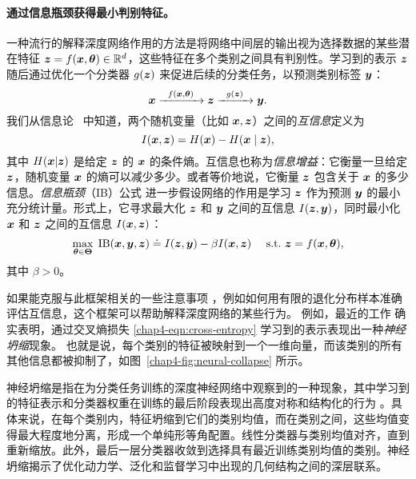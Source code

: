 \documentclass[../../book-main.tex]{subfiles}
\begin{document}
\paragraph{通过信息瓶颈获得最小判别特征。}
一种流行的解释深度网络作用的方法是将网络中间层的输出视为选择数据的某些潜在特征 $\bm{z} = f(\bm{x}, \bm \theta) \in \mathbb{R}^d$，这些特征在多个类别之间具有判别性。学习到的表示 $\bm{z}$ 随后通过优化一个分类器 $g(\bm{z})$ 来促进后续的分类任务，以预测类别标签 $\bm{y}$：
\begin{equation}
	\bm{x}   \xrightarrow{\hspace{2mm} f(\bm{x}, \bm \theta)\hspace{2mm}} \bm{z}  \xrightarrow{\hspace{2mm} g(\bm{z}) \hspace{2mm}} \bm{y}.
\end{equation}
我们从信息论~\cite{Cover-Thomas} 中知道，两个随机变量（比如 $\bm{x},\bm{z}$）之间的{\em 互信息}定义为
\begin{equation}
	I(\bm{x}, \bm{z}) = H(\bm{x}) - H(\bm{x}\mid \bm{z}),
\end{equation}
其中 $H(\bm{x} \vert \bm{z})$ 是给定 $\bm{z}$ 的 $\bm{x}$ 的条件熵。互信息也称为{\em 信息增益}：它衡量一旦给定 $\bm{z}$，随机变量 $\bm{x}$ 的熵可以减少多少。或者等价地说，它衡量 $\bm{z}$ 包含关于 $\bm{x}$ 的多少信息。{\em 信息瓶颈}（IB）公式 \cite{Tishby-ITW2015} 进一步假设网络的作用是学习 $\bm{z}$ 作为预测 $\bm{y}$ 的最小充分统计量。形式上，它寻求最大化 $\bm{z}$ 和 $\bm{y}$ 之间的互信息 $I(\bm{z}, \bm{y})$，同时最小化 $\bm{x}$ 和 $\bm{z}$ 之间的互信息 $I(\bm{x}, \bm{z})$：
\begin{equation}
	\max_{\bm \theta\in \bm \Theta}\; \mbox{IB}(\bm{x}, \bm{y}, \bm{z}) \doteq I(\bm{z}, \bm{y}) - \beta I(\bm{x}, \bm{z}) \quad\ \mathrm{s.t.}\ \bm{z} = f(\bm{x}, \bm \theta),
	\label{chap4-eqn:information-bottleneck}
\end{equation}
其中 $\beta >0$。

如果能克服与此框架相关的一些注意事项 \cite{kolchinsky2018caveats-ICLR2018}，例如如何用有限的退化分布样本准确评估互信息，这个框架可以帮助解释深度网络的某些行为。
例如，最近的工作 \cite{papyan2020prevalence} 确实表明，通过交叉熵损失 \eqref{chap4-eqn:cross-entropy} 学习到的表示表现出一种\emph{神经坍缩}现象。
也就是说，每个类别的特征被映射到一个一维向量，而该类别的所有其他信息都被抑制了，如图~\ref{chap4-fig:neural-collapse} 所示。
\begin{remark}
    神经坍缩是指在为分类任务训练的深度神经网络中观察到的一种现象，其中学习到的特征表示和分类器权重在训练的最后阶段表现出高度对称和结构化的行为 \cite{papyan2020prevalence,zhu2021geometric}。具体来说，在每个类别内，特征坍缩到它们的类别均值，而在类别之间，这些均值变得最大程度地分离，形成一个单纯形等角配置。线性分类器与类别均值对齐，直到重新缩放。此外，最后一层分类器收敛到选择具有最近训练类别均值的类别。神经坍缩揭示了优化动力学、泛化和监督学习中出现的几何结构之间的深层联系。
\end{remark}
\end{document}
